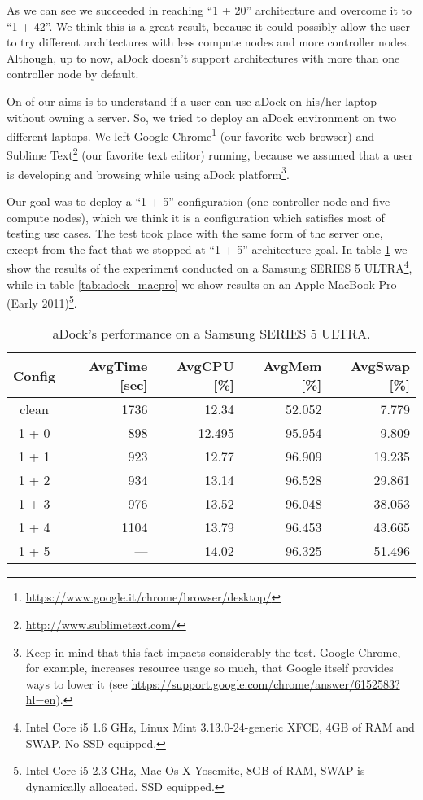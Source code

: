 As we can see we succeeded in reaching ``1 + 20'' architecture and overcome it to ``1 + 42''. We think this is a great result, because it could possibly allow the user to try different architectures with less compute nodes and more controller nodes. Although, up to now, aDock doesn't support architectures with more than one controller node by default.

On of our aims is to understand if a user can use aDock on his/her laptop without owning a server. So, we tried to deploy an aDock environment on two different laptops. We left Google Chrome\footnote{\url{https://www.google.it/chrome/browser/desktop/}} (our favorite web browser) and Sublime Text\footnote{\url{http://www.sublimetext.com/}} (our favorite text editor) running, because we assumed that a user is developing and browsing while using aDock platform\footnote{Keep in mind that this fact impacts considerably the test. Google Chrome, for example, increases resource usage so much, that Google itself provides ways to lower it (see \url{https://support.google.com/chrome/answer/6152583?hl=en}).}.

Our goal was to deploy a ``1 + 5'' configuration (one controller node and five compute nodes), which we think it is a configuration which satisfies most of testing use cases. The test took place with the same form of the server one, except from the fact that we stopped at ``1 + 5'' architecture goal. In table \ref{tab:adock_ultra} we show the results of the experiment conducted on a Samsung SERIES 5 ULTRA\footnote{Intel Core i5 1.6 GHz, Linux Mint 3.13.0-24-generic XFCE, 4GB of RAM and SWAP. No SSD equipped.}, while in table \ref{tab:adock_macpro} we show results on an Apple MacBook Pro (Early 2011)\footnote{Intel Core i5 2.3 GHz, Mac Os X Yosemite, 8GB of RAM, SWAP is dynamically allocated. SSD equipped.}.

\begin{table}[h!]
\centering
  \begin{tabular}{| c | r | r | r | r |}
  \hline
  \textbf{Config} & \textbf{AvgTime [sec]} & \textbf{AvgCPU [\%]} & \textbf{AvgMem [\%]} & \textbf{AvgSwap [\%]}  \\
  \hline
  clean & 1736 & 12.34 & 52.052 & 7.779 \\
  \hline
  1 + 0 & 898 & 12.495 & 95.954 & 9.809 \\
  \hline
  1 + 1 & 923 & 12.77 & 96.909 & 19.235 \\
  \hline
  1 + 2 & 934 & 13.14 & 96.528 & 29.861 \\
  \hline
  1 + 3 & 976 & 13.52 & 96.048 & 38.053 \\
  \hline
  1 + 4 & 1104 & 13.79 & 96.453 & 43.665 \\
  \hline
  1 + 5 & --- & 14.02 & 96.325 & 51.496 \\
  \hline
  \end{tabular}
  \vspace{2mm}
  \caption{aDock's performance on a Samsung SERIES 5 ULTRA.}
  \label{tab:adock_ultra}
\end{table}

